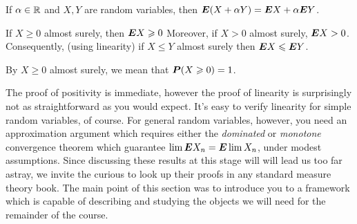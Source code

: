\begin{proposition}[Linearity]
  If $\alpha \in \R$ and $X, Y$ are random variables, then $\E(X + \alpha Y) = \E X + \alpha \E Y$.
\end{proposition}

\begin{proposition}[Positivity]
  If $X \geq 0$ almost surely, then $\E X \geq 0$
  Moreover, if $X > 0$ almost surely, $\E X > 0$.
  Consequently, (using linearity) if $X \leq Y$ almost surely then $\E X \leq \E Y$.
\end{proposition}
\begin{remark}
  By $X \geq 0$ almost surely, we mean that $\P(X \geq 0) = 1$.
\end{remark}

The proof of positivity is immediate, however the proof of linearity is surprisingly not as straightforward as you would expect.
It's easy to verify linearity for simple random variables, of course.
For general random variables, however, you need an approximation argument which requires either the \emph{dominated} or \emph{monotone} convergence theorem which guarantee $\lim \E X_n = \E \lim X_n$, under modest assumptions.
Since discussing these results at this stage will will lead us too far astray, we invite the curious to look up their proofs in any standard measure theory book.
The main point of this section was to introduce you to a framework which is capable of describing and studying the objects we will need for the remainder of the course.


